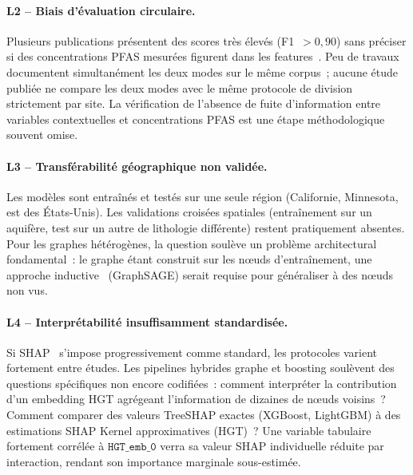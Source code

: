 \paragraph{L2 -- Biais d'\'evaluation circulaire.}
Plusieurs publications pr\'esentent des scores tr\`es \'elev\'es (F1~$> 0{,}90$) sans pr\'eciser si des concentrations PFAS mesur\'ees figurent dans les features~\cite{george2021pfas}.
Peu de travaux documentent simultan\'ement les deux modes sur le m\^eme corpus~; aucune \'etude publi\'ee ne compare les deux modes avec le m\^eme protocole de division strictement par site.
La v\'erification de l'absence de fuite d'information entre variables contextuelles et concentrations PFAS est une \'etape m\'ethodologique souvent omise.

\paragraph{L3 -- Transf\'erabilit\'e g\'eographique non valid\'ee.}
Les mod\`eles sont entra\^in\'es et test\'es sur une seule r\'egion (Californie, Minnesota, est des \'Etats-Unis).
Les validations crois\'ees spatiales (entra\^inement sur un aquif\`ere, test sur un autre de lithologie diff\'erente) restent pratiquement absentes.
Pour les graphes h\'et\'erog\`enes, la question soul\`eve un probl\`eme architectural fondamental~: le graphe \'etant construit sur les n\oe uds d'entra\^inement, une approche inductive~\cite{hamilton2017inductive} (GraphSAGE) serait requise pour g\'en\'eraliser \`a des n\oe uds non vus.

\paragraph{L4 -- Interpr\'etabilit\'e insuffisamment standardis\'ee.}
Si SHAP~\cite{lundberg2017shap} s'impose progressivement comme standard, les protocoles varient fortement entre \'etudes.
Les pipelines hybrides graphe et boosting soul\`event des questions sp\'ecifiques non encore codifi\'ees~: comment interpr\'eter la contribution d'un embedding HGT agr\'egeant l'information de dizaines de n\oe uds voisins~? Comment comparer des valeurs TreeSHAP exactes (XGBoost, LightGBM) \`a des estimations SHAP Kernel approximatives (HGT)~? Une variable tabulaire fortement corr\'el\'ee \`a $\texttt{HGT\_emb\_0}$ verra sa valeur SHAP individuelle r\'eduite par interaction, rendant son importance marginale sous-estim\'ee.

